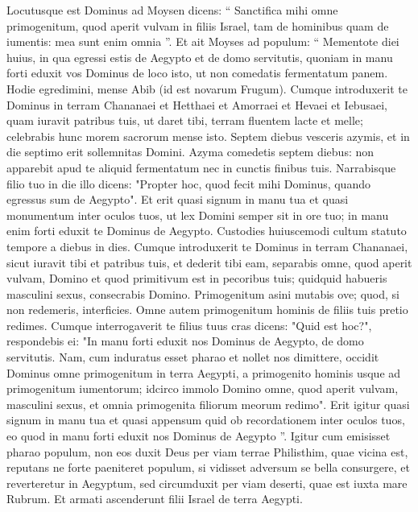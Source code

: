 \begin{biblechapter}
\begin{biblechapter}
\begin{biblechapter}
\begin{biblechapter}
\begin{biblechapter}
\begin{biblechapter}
\begin{biblechapter}
\begin{biblechapter}
\begin{biblechapter}
\begin{biblechapter}
\begin{biblechapter}
\begin{biblechapter}
\begin{biblechapter}
\verse Locutusque est Dominus ad Moysen dicens: 
\verse “ Sanctifica mihi omne primogenitum, quod aperit vulvam in filiis Israel, tam de hominibus quam de iumentis: mea sunt enim omnia ”.
 \verse Et ait Moyses ad populum: “ Mementote diei huius, in qua egressi estis de Aegypto et de domo servitutis, quoniam in manu forti eduxit vos Dominus de loco isto, ut non comedatis fermentatum panem. 
\verse Hodie egredimini, mense Abib (id est novarum Frugum). 
\verse Cumque introduxerit te Dominus in terram Chananaei et Hetthaei et Amorraei et Hevaei et Iebusaei, quam iuravit patribus tuis, ut daret tibi, terram fluentem lacte et melle; celebrabis hunc morem sacrorum mense isto.
 \verse Septem diebus vesceris azymis, et in die septimo erit sollemnitas Domini. 
 \verse Azyma comedetis septem diebus: non apparebit apud te aliquid fermentatum nec in cunctis finibus tuis. 
\verse Narrabisque filio tuo in die illo dicens: "Propter hoc, quod fecit mihi Dominus, quando egressus sum de Aegypto". 
\verse Et erit quasi signum in manu tua et quasi monumentum inter oculos tuos, ut lex Domini semper sit in ore tuo; in manu enim forti eduxit te Dominus de Aegypto. 
 \verse Custodies huiuscemodi cultum statuto tempore a diebus in dies.
 \verse Cumque introduxerit te Dominus in terram Chananaei, sicut iuravit tibi et patribus tuis, et dederit tibi eam, 
\verse separabis omne, quod aperit vulvam, Domino et quod primitivum est in pecoribus tuis; quidquid habueris masculini sexus, consecrabis Domino. 
\verse Primogenitum asini mutabis ove; quod, si non redemeris, interficies. Omne autem primogenitum hominis de filiis tuis pretio redimes. 
\verse Cumque interrogaverit te filius tuus cras dicens: "Quid est hoc?", respondebis ei: "In manu forti eduxit nos Dominus de Aegypto, de domo servitutis. 
\verse Nam, cum induratus esset pharao et nollet nos dimittere, occidit Dominus omne primogenitum in terra Aegypti, a primogenito hominis usque ad primogenitum iumentorum; idcirco immolo Domino omne, quod aperit vulvam, masculini sexus, et omnia primogenita filiorum meorum redimo". 
\verse Erit igitur quasi signum in manu tua et quasi appensum quid ob recordationem inter oculos tuos, eo quod in manu forti eduxit nos Dominus de Aegypto ”.
 \verse Igitur cum emisisset pharao populum, non eos duxit Deus per viam terrae Philisthim, quae vicina est, reputans ne forte paeniteret populum, si vidisset adversum se bella consurgere, et reverteretur in Aegyptum, 
\verse sed circumduxit per viam deserti, quae est iuxta mare Rubrum. Et armati ascenderunt filii Israel de terra Aegypti. 

\end{biblechapter}
\end{biblechapter}
\end{biblechapter}
\end{biblechapter}
\end{biblechapter}
\end{biblechapter}
\end{biblechapter}
\end{biblechapter}
\end{biblechapter}
\end{biblechapter}
\end{biblechapter}
\end{biblechapter}
\end{biblechapter}
